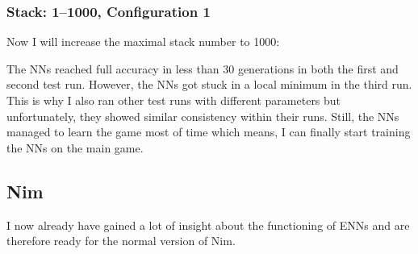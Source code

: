 \documentclass[11pt]{report}
\begin{document}
\begin{enumerate}
    \subsubsection{Stack: 1--1000, Configuration 1}
    Now I will increase the maximal stack number to 1000:
    \renewcommand{\csvpath}{../data/simple_nim/stack_1000r/t_1/stats.csv} %
    \begin{center}
    \end{center}
    The NNs reached full accuracy in less than 30 generations in both the first and second test run.
    However, the NNs got stuck in a local minimum in the third run.
    This is why I also ran other test runs with different parameters but unfortunately, they showed similar consistency within their runs.
    Still, the NNs managed to learn the game most of time which means, I can finally start training the NNs on the main game.

    \subsection{Nim}
    I now already have gained a lot of insight about the functioning of ENNs and are therefore ready for the normal version of Nim.


\end{enumerate}
\end{document}
